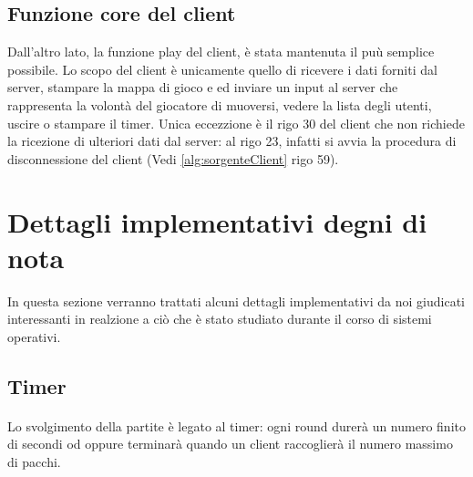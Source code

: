 \documentclass[a4paper]{article}
\begin{document}
\subsection{Funzione core del client}
Dall'altro lato, la funzione play del client, è stata mantenuta il puù semplice possibile.
Lo scopo del client è unicamente quello di ricevere i dati forniti dal server, stampare la mappa di gioco e ed inviare un input al server che rappresenta la volontà del giocatore di muoversi, vedere la lista degli utenti, uscire o stampare il timer.
Unica eccezzione è il rigo 30  del client che non richiede la ricezione di ulteriori dati dal server: al rigo 23, infatti si avvia la procedura di disconnessione del client (Vedi \autoref{alg:sorgenteClient} rigo 59).
\pagebreak


\pagebreak

\pagebreak
\section{Dettagli implementativi degni di nota}
In questa sezione verranno trattati alcuni dettagli implementativi da noi giudicati interessanti in realzione a ciò che è stato studiato durante il corso di sistemi operativi.
\subsection{Timer}
\paragraph{}
Lo svolgimento della partite è legato al timer:  ogni round durerà un numero finito di secondi od oppure terminarà
quando un client raccoglierà il numero massimo di pacchi.
\end{document}
